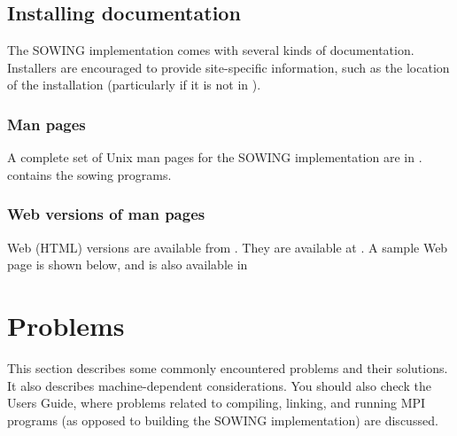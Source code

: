 \documentclass[11pt,twoside]{article}
\begin{document}
\subsection{Installing documentation}
The SOWING implementation comes with several kinds of documentation.
Installers are encouraged to provide site-specific information, such
as the location of the installation (particularly if it is not in
).

\subsubsection{Man pages}
A complete set of Unix man pages for the SOWING implementation are in
.   contains the sowing programs.

\subsubsection{Web versions of man pages}
Web (HTML) versions are available from
.  They are available
at .
A sample Web page is shown below, and is also available in


\section{Problems}
\label{sec:problems}

This section describes some commonly encountered problems and
their solutions.  It also describes machine-dependent considerations.
You should also check the Users Guide, where problems related to compiling,
linking, and running MPI programs (as opposed to building the SOWING
implementation) are  discussed.
\end{document}
